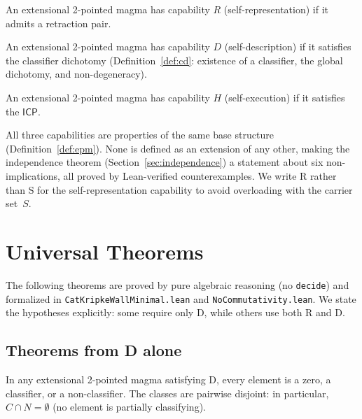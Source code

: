 \documentclass[a4paper,UKenglish,cleveref,autoref,thm-restate]{lipics-v2021}
\newcommand{\ICP}{\textsf{ICP}}
\begin{document}
\begin{definition}[Capability R]
An extensional 2-pointed magma has capability $R$ (self-representation) if it admits a retraction pair.
\end{definition}

\begin{definition}[Capability D]
An extensional 2-pointed magma has capability $D$ (self-description) if it satisfies the classifier dichotomy (Definition~\ref{def:cd}: existence of a classifier, the global dichotomy, and non-degeneracy).
\end{definition}

\begin{definition}[Capability H]
An extensional 2-pointed magma has capability $H$ (self-execution) if it satisfies the $\ICP$.
\end{definition}

All three capabilities are properties of the same base structure (Definition~\ref{def:epm}). None is defined as an extension of any other, making the independence theorem (Section~\ref{sec:independence}) a statement about six non-implications, all proved by Lean-verified counterexamples. We write R rather than S for the self-representation capability to avoid overloading with the carrier set~$S$.

\section{Universal Theorems}
\label{sec:universal}

The following theorems are proved by pure algebraic reasoning (no \texttt{decide}) and formalized in \texttt{CatKripkeWallMinimal.lean} and \texttt{NoCommutativity.lean}. We state the hypotheses explicitly: some require only D, while others use both R and D.

\subsection{Theorems from D alone}

\begin{theorem}
\label{thm:three-cat}
In any extensional 2-pointed magma satisfying D, every element is a zero, a classifier, or a non-classifier. The classes are pairwise disjoint: in particular, $C \cap N = \emptyset$ (no element is partially classifying).
\end{theorem}
\end{document}
